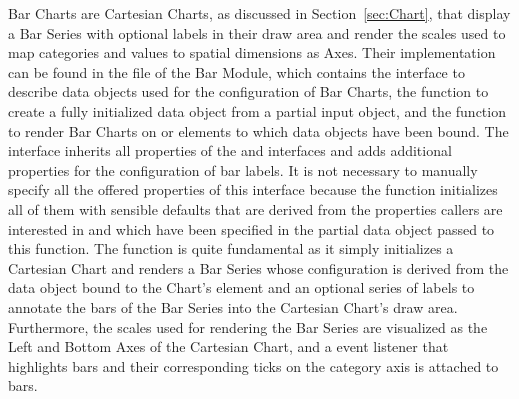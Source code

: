 Bar Charts are Cartesian Charts, as discussed in Section~\ref{sec:Chart}, that display a Bar Series with optional labels in their draw area and render the scales used to map categories and values to spatial dimensions as Axes.
Their implementation can be found in the  file of the Bar Module, which contains the  interface to describe data objects used for the configuration of Bar Charts, the  function to create a fully initialized  data object from a partial input object, and the  function to render Bar Charts on  or  elements to which  data objects have been bound.
The  interface inherits all properties of the  and  interfaces and adds additional properties for the configuration of bar labels.
It is not necessary to manually specify all the offered properties of this interface because the  function initializes all of them with sensible defaults that are derived from the properties callers are interested in and which have been specified in the partial data object passed to this function.
The  function is quite fundamental as it simply initializes a Cartesian Chart and renders a Bar Series whose configuration is derived from the  data object bound to the Chart's element and an optional series of labels to annotate the bars of the Bar Series into the Cartesian Chart's draw area. 
Furthermore, the scales used for rendering the Bar Series are visualized as the Left and Bottom Axes of the Cartesian Chart, and a  event listener that highlights bars and their corresponding ticks on the category axis is attached to bars.

